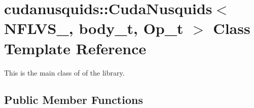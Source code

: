 \hypertarget{classcudanusquids_1_1CudaNusquids}{}\section{cudanusquids\+:\+:Cuda\+Nusquids$<$ N\+F\+L\+V\+S\+\_\+, body\+\_\+t, Op\+\_\+t $>$ Class Template Reference}
\label{classcudanusquids_1_1CudaNusquids}


This is the main class of of the library.  


\subsection*{Public Member Functions}
